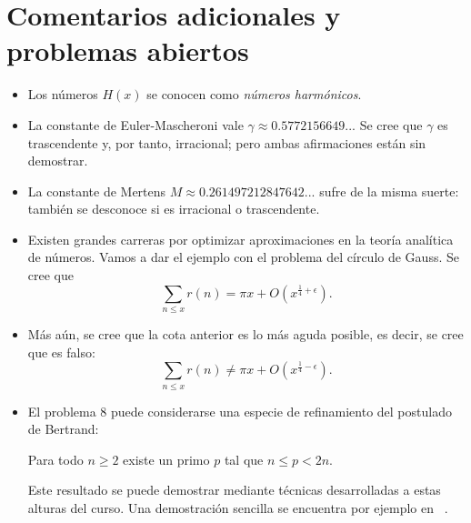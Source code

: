 \documentclass[11pt, reqno]{amsart}
\begin{document}
\section{Comentarios adicionales y problemas abiertos}
\begin{itemize}
	\item Los números $H(x)$ se conocen como \textit{números harmónicos}.
	\item La constante de Euler-Mascheroni vale $\gamma \approx 0.5772156649...$
		Se cree que $\gamma$ es trascendente y, por tanto, irracional; pero ambas afirmaciones están sin demostrar.
	\item La constante de Mertens $M \approx 0.261497212847642...$ sufre de la misma suerte: también se desconoce si es irracional o trascendente.
	\item Existen grandes carreras por optimizar aproximaciones en la teoría analítica de números.
		Vamos a dar el ejemplo con el problema del círculo de Gauss.
		Se cree que
		$$ \sum_{n \le x} r(n) = \pi x + O\left( x^{\frac{1}{4} + \epsilon} \right). $$
	\item Más aún, se cree que la cota anterior es lo más aguda posible, es decir, se cree que es falso:
		$$ \sum_{n \le x} r(n) \ne \pi x + O\left( x^{\frac{1}{4} - \epsilon} \right). $$
	\item El problema 8 puede considerarse una especie de refinamiento del postulado de Bertrand:

		\begin{thm}
			Para todo $n \ge 2$ existe un primo $p$ tal que $n \le p < 2n$.
		\end{thm}

		Este resultado se puede demostrar mediante técnicas desarrolladas a estas alturas del curso.
		Una demostración sencilla se encuentra por ejemplo en \citeauthor{hua:number}~\cite[82-85]{hua:number}.
\end{itemize}
\end{document}
